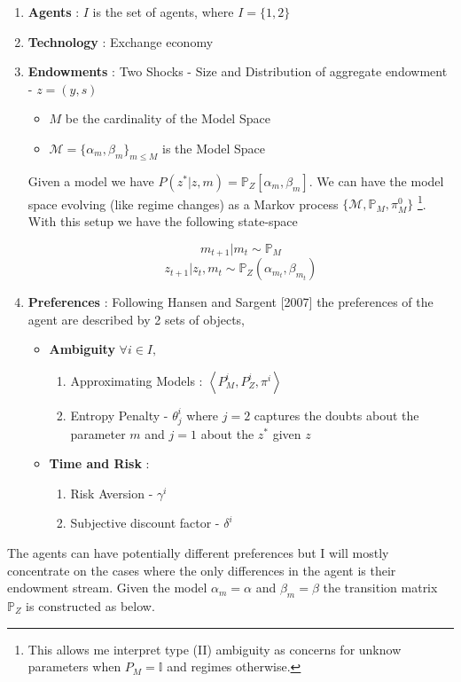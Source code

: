 \documentclass[12pt]{article}
\begin{document}
\begin{enumerate}
		\item \textbf{Agents}  : $I$ is the  set of agents, where $I= \{1,2\}$
		\item \textbf{Technology} : Exchange economy
		\item \textbf{Endowments}  : Two Shocks - Size and
                  Distribution of aggregate endowment - $z=(y,s)$

									\begin{itemize}
											\item $M$ be the cardinality of the Model Space
											\item $\mathcal{M}=\{\alpha_m,\beta_m\}_{m\leq M}$ is the Model Space
									\end{itemize}
									
\noindent Given a model we have $P(z^*|z,m)=\mathbb{P}_{Z}[\alpha_m,\beta_m]$. We can have the model space evolving (like regime changes) as a Markov process $\{\mathcal{M},\mathbb{P}_{M},\pi^0_{M}\}$ \footnote{This allows me interpret type (II) ambiguity as concerns for unknow parameters when $P_M=\mathbb{I}$ and regimes otherwise.}. With this setup we have the following state-space

\[m_{t+1} | m_t \sim \mathbb{P}_{M}\]
\[z_{t+1}|z_t,m_t \sim \mathbb{P}_{Z}(\alpha_{m_t},\beta_{m_t})\]

\item \textbf{Preferences} : Following Hansen and Sargent [2007] the preferences of the agent are described by 2 sets of 		objects, 
								\begin{itemize}
										\item \textbf{Ambiguity}
													$\forall i \in I,$
												\begin{enumerate}
															\item Approximating Models :   $\left\langle  P^i_M,P_Z^i, \pi^i \right\rangle$
															\item Entropy Penalty - $\theta_j^i$ where $j=2$ captures the doubts about the parameter $m$ and $j=1$ about the $z^*$ given $z$
												\end{enumerate}
											\item \textbf{Time and Risk} :
																\begin{enumerate}
																		\item Risk Aversion - $\gamma^i$
																		\item Subjective discount factor - $\delta^i$
																\end{enumerate}
 												\end{itemize}
\end{enumerate}
The agents can have potentially different preferences but I will mostly concentrate on the cases where the only differences in the agent is their endowment stream. Given the model $\alpha_m=\alpha$ and $\beta_m= \beta$ the transition matrix $\mathbb{P}_{Z}$ is constructed as below. 
\end{document}
